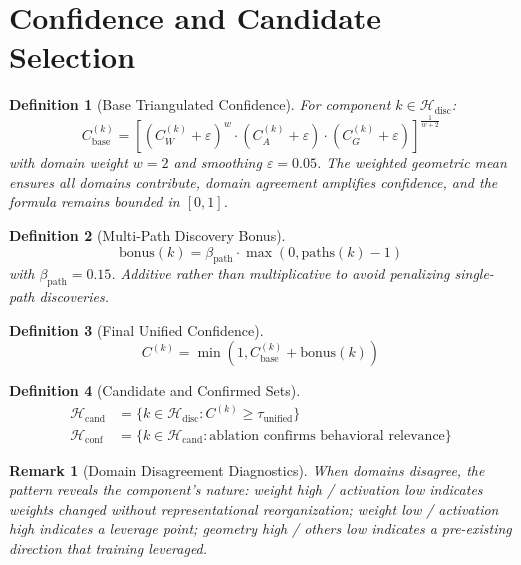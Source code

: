 \documentclass[11pt]{article}
\newtheorem{definition}{Definition}[section]
\newtheorem{remark}{Remark}[section]
\begin{document}
\section{Confidence and Candidate Selection}
\label{sec:confidence}

\begin{definition}[Base Triangulated Confidence]
For component $k \in \mathcal{H}_{\text{disc}}$:
\begin{equation}
C^{(k)}_{\text{base}} = \left[(C^{(k)}_W + \varepsilon)^w \cdot (C^{(k)}_A + \varepsilon) \cdot (C^{(k)}_G + \varepsilon)\right]^{\frac{1}{w+2}}
\end{equation}
with domain weight $w = 2$ and smoothing $\varepsilon = 0.05$. The weighted geometric mean ensures all domains contribute, domain agreement amplifies confidence, and the formula remains bounded in $[0, 1]$.
\end{definition}

\begin{definition}[Multi-Path Discovery Bonus]
\begin{equation}
\text{bonus}(k) = \beta_{\text{path}} \cdot \max(0, \text{paths}(k) - 1)
\end{equation}
with $\beta_{\text{path}} = 0.15$. Additive rather than multiplicative to avoid penalizing single-path discoveries.
\end{definition}

\begin{definition}[Final Unified Confidence]
\begin{equation}
C^{(k)} = \min(1, C^{(k)}_{\text{base}} + \text{bonus}(k))
\end{equation}
\end{definition}

\begin{definition}[Candidate and Confirmed Sets]
\begin{align}
\mathcal{H}_{\text{cand}} &= \{k \in \mathcal{H}_{\text{disc}} : C^{(k)} \geq \tau_{\text{unified}}\} \\
\mathcal{H}_{\text{conf}} &= \{k \in \mathcal{H}_{\text{cand}} : \text{ablation confirms behavioral relevance}\}
\end{align}
\end{definition}

\begin{remark}[Domain Disagreement Diagnostics]
When domains disagree, the pattern reveals the component's nature: weight high / activation low indicates weights changed without representational reorganization; weight low / activation high indicates a leverage point; geometry high / others low indicates a pre-existing direction that training leveraged.
\end{remark}
\end{document}
